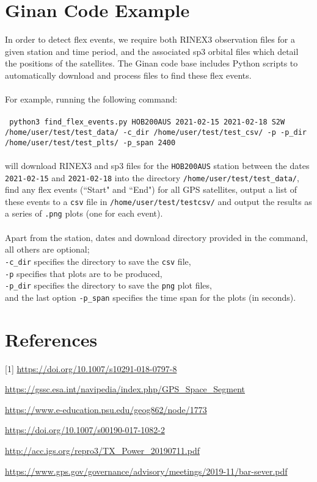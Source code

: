 \section{Ginan Code Example}
In order to detect flex events, we require both RINEX3 observation files for a given station and time period, and the associated sp3 orbital files which detail the positions of the satellites. The Ginan code base includes Python scripts to automatically download and process files to find these flex events. 
\\
\\
For example, running the following command:
\\
\\
\texttt{
python3 find\_flex\_events.py HOB200AUS 2021-02-15 2021-02-18 S2W
/home/user/test/test\_data/ -c\_dir /home/user/test/test\_csv/ 
-p -p\_dir /home/user/test/test\_plts/ -p\_span 2400}
\\
\\
will download RINEX3 and sp3 files for the \texttt{HOB200AUS} station between the dates \texttt{2021-02-15} and \texttt{2021-02-18} into the directory \texttt{/home/user/test/test\_data/}, find any flex events (``Start" and ``End") for all GPS satellites, output a list of these events to a \texttt{csv} file in \texttt{/home/user/test/testcsv/} and output the results as a series of \texttt{.png} plots (one for each event). 
\\
\\
Apart from the station, dates and download directory provided in the command, all others are optional;
\\
\texttt{-c\_dir} specifies the directory to save the \texttt{csv} file, 
\\
\texttt{-p} specifies that plots are to be produced, 
\\
\texttt{-p\_dir} specifies the directory to save the \texttt{png} plot files,
\\ 
and the last option \texttt{-p\_span} specifies the time span for the plots (in seconds).

\section{References}

[1] \url{https://doi.org/10.1007/s10291-018-0797-8}
\par
[2] \url{https://gssc.esa.int/navipedia/index.php/GPS_Space_Segment}
\par
[3] \url{https://www.e-education.psu.edu/geog862/node/1773}
\par
[4] \url{https://doi.org/10.1007/s00190-017-1082-2}
\par
[5] \url{http://acc.igs.org/repro3/TX\_Power\_20190711.pdf}
\par
[6] \url{https://www.gps.gov/governance/advisory/meetings/2019-11/bar-sever.pdf}